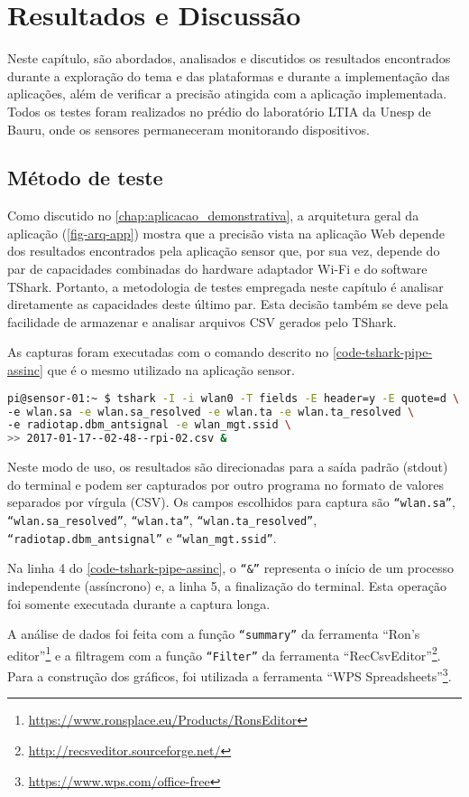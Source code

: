 \chapter{Resultados e Discussão}
\label{chap:resultados}

Neste capítulo, são abordados, analisados e discutidos os resultados encontrados
durante a exploração do tema e das plataformas e durante a implementação das
aplicações, além de verificar a precisão atingida com a aplicação implementada.
Todos os testes foram realizados no prédio do laboratório
LTIA da Unesp de Bauru, onde os sensores permaneceram monitorando dispositivos.

\section{Método de teste}
\label{sec:metodo-teste}

Como discutido no \autoref{chap:aplicacao_demonstrativa}, a arquitetura geral da aplicação (\autoref{fig-arq-app})
mostra que a precisão vista na aplicação Web depende dos resultados
encontrados pela aplicação sensor que, por sua vez, depende do par de
capacidades combinadas do hardware adaptador Wi-Fi e do software
TShark. Portanto, a metodologia de testes empregada neste capítulo é
analisar diretamente as capacidades deste último par. Esta decisão também se
deve pela facilidade de armazenar e analisar arquivos CSV gerados pelo
TShark.

As capturas foram executadas com o comando descrito no \autoref{code-tshark-pipe-assinc}
que é o mesmo utilizado na aplicação sensor.

\begin{lstlisting}[language=bash,caption={TShark e redirecionamento da saída para arquivo assíncrono},label=code-tshark-pipe-assinc]
pi@sensor-01:~ $ tshark -I -i wlan0 -T fields -E header=y -E quote=d \
-e wlan.sa -e wlan.sa_resolved -e wlan.ta -e wlan.ta_resolved \
-e radiotap.dbm_antsignal -e wlan_mgt.ssid \
>> 2017-01-17--02-48--rpi-02.csv &
\end{lstlisting}

Neste modo de uso, os resultados são direcionadas para a saída padrão
(stdout)  do terminal e podem ser capturados por outro programa no formato
de valores separados por vírgula (CSV). Os campos escolhidos para captura
são \texttt{``wlan.sa''}, \texttt{``wlan.sa\_resolved''}, \texttt{``wlan.ta''},
\texttt{``wlan.ta\_resolved''}, \texttt{``radiotap.dbm\_antsignal''} e \texttt{``wlan\_mgt.ssid''}.

Na linha 4 do \autoref{code-tshark-pipe-assinc}, o \texttt{``\&''} representa o início
de um processo independente (assíncrono) e, a linha 5, a finalização do terminal.
Esta operação foi somente executada durante a captura longa.

A análise de dados foi feita com a função \texttt{``summary''} da ferramenta
``Ron’s editor''\footnote{\url{https://www.ronsplace.eu/Products/RonsEditor}}
e a filtragem com a função \texttt{``Filter''} da ferramenta
``RecCsvEditor''\footnote{\url{http://recsveditor.sourceforge.net/}}. Para a
construção dos gráficos, foi utilizada a ferramenta
``WPS Spreadsheets''\footnote{\url{https://www.wps.com/office-free}}.
